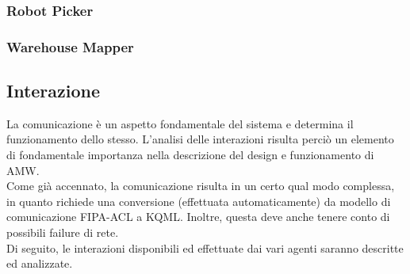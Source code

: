 \subsubsection{Robot Picker}
\subsubsection{Warehouse Mapper}

\subsection{Interazione}


La comunicazione è un aspetto fondamentale del sistema e determina il funzionamento dello stesso. L'analisi delle interazioni risulta perciò un elemento di fondamentale importanza nella descrizione del design e funzionamento di AMW.\\
Come già accennato, la comunicazione risulta in un certo qual modo complessa, in quanto richiede una conversione (effettuata automaticamente) da modello di comunicazione FIPA-ACL a KQML. Inoltre, questa deve anche tenere conto di possibili failure di rete.\\
Di seguito, le interazioni disponibili ed effettuate dai vari agenti saranno descritte ed analizzate.

